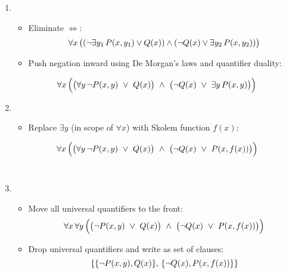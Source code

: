 \begin{enumerate}
    \item {}
    \begin{itemize}
        \item Eliminate \(\iff\):
          \[\forall x  \, \big( (\neg \exists y_1 \,  P(x,y_1) \lor Q(x)) \land (\neg Q(x) \lor \exists y_2 \,  P(x,y_2))\big)\]
        \item Push negation inward using De Morgan's laws and quantifier duality:
    \end{itemize}
    \[
    \forall x \, \Big(\big(\forall y \, \neg P(x,y)\ \lor\ Q(x)\big)\ \land\ \big(\neg Q(x)\ \lor\ \exists y \,  P(x,y)\big)\Big)
    \]
    
    
    \item {}
    \begin{itemize}
        \item Replace \(\exists y\) (in scope of \(\forall x\)) with Skolem function \(f(x)\):
    \end{itemize}
    \[
      \forall x \ms \Big(\big(\forall y \ms \neg P(x,y)\ \lor\ Q(x)\big)\ \land\ \big(\neg Q(x)\ \lor\ P(x,f(x))\big)\Big)
    \]
    \\
    \item {}
    \begin{itemize}
    \item Move all universal quantifiers to the front:
    \[
      \forall x \ms  \forall y \ms  \Big(\big(\neg P(x,y)\ \lor\ Q(x)\big)\ \land\ \big(\neg Q(x)\ \lor\ P(x,f(x))\big)\Big)
    \]
    \item Drop universal quantifiers and write as set of clauses:
    \[
      \{\{\neg P(x,y), Q(x)\}, \,  \{\neg Q(x), P(x,f(x))\}\}
    \]
    \end{itemize}
    
\end{enumerate}

